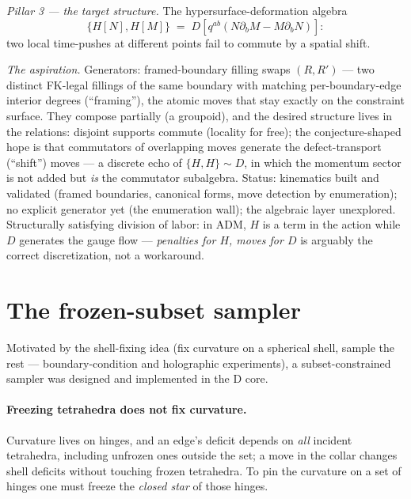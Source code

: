 \documentclass[11pt]{article}
\begin{document}
\emph{Pillar 3 --- the target structure.} The hypersurface-deformation
algebra \cite{adm}
\begin{equation}
\{H[N], H[M]\} \;=\; D\!\left[q^{ab}(N\partial_b M - M\partial_b N)\right]:
\end{equation}
two local time-pushes at different points fail to commute by a spatial
shift.

\emph{The aspiration.} Generators: framed-boundary filling swaps $(R,R')$
--- two distinct FK-legal fillings of the same boundary with matching
per-boundary-edge interior degrees (``framing''), the atomic moves that stay
exactly on the constraint surface. They compose partially (a groupoid), and
the desired structure lives in the relations: disjoint supports commute
(locality for free); the conjecture-shaped hope is that commutators of
overlapping moves generate the defect-transport (``shift'') moves --- a
discrete echo of $\{H,H\} \sim D$, in which the momentum sector is not added
but \emph{is} the commutator subalgebra. Status: kinematics built and
validated (framed boundaries, canonical forms, move detection by
enumeration); no explicit generator yet (the enumeration wall); the
algebraic layer unexplored. Structurally satisfying division of labor: in
ADM, $H$ is a term in the action while $D$ generates the gauge flow ---
\emph{penalties for $H$, moves for $D$} is arguably the correct
discretization, not a workaround.

\section{The frozen-subset sampler}
\label{sec:frozen}

Motivated by the shell-fixing idea (fix curvature on a spherical shell,
sample the rest --- boundary-condition and holographic experiments), a
subset-constrained sampler was designed and implemented in the D core.

\paragraph{Freezing tetrahedra does not fix curvature.} Curvature lives on
hinges, and an edge's deficit depends on \emph{all} incident tetrahedra,
including unfrozen ones outside the set; a move in the collar changes shell
deficits without touching frozen tetrahedra. To pin the curvature on a set
of hinges one must freeze the \emph{closed star} of those hinges.
\end{document}

